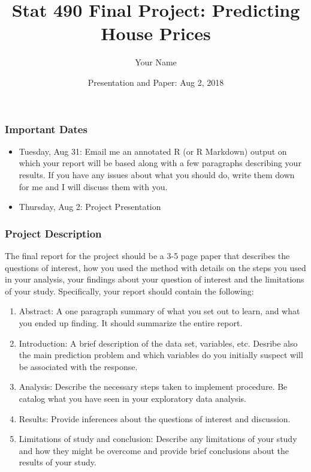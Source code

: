 \documentclass[]{article}
\title{Stat 490 Final Project: Predicting House Prices}
\author{Your Name}
\date{Presentation and Paper: Aug 2, 2018}
\begin{document}
\maketitle

\subsubsection{Important Dates}\label{important-dates}

\begin{itemize}
\item
  Tuesday, Aug 31: Email me an annotated R (or R Markdown) output on
  which your report will be based along with a few paragraphs describing
  your results. If you have any issues about what you should do, write
  them down for me and I will discuss them with you.
\item
  Thursday, Aug 2: Project Presentation
\end{itemize}

\subsubsection{Project Description}\label{project-description}

The final report for the project should be a 3-5 page paper that
describes the questions of interest, how you used the method with
details on the steps you used in your analysis, your findings about your
question of interest and the limitations of your study. Specifically,
your report should contain the following:

\begin{enumerate}
\def\labelenumi{\arabic{enumi}.}
\item
  Abstract: A one paragraph summary of what you set out to learn, and
  what you ended up finding. It should summarize the entire report.
\item
  Introduction: A brief description of the data set, variables, etc.
  Desribe also the main prediction problem and which variables do you
  initially suspect will be associated with the response.
\item
  Analysis: Describe the necessary steps taken to implement procedure.
  Be catalog what you have seen in your exploratory data analysis.
\item
  Results: Provide inferences about the questions of interest and
  discussion.
\item
  Limitations of study and conclusion: Describe any limitations of your
  study and how they might be overcome and provide brief conclusions
  about the results of your study.
\end{enumerate}
\end{document}
